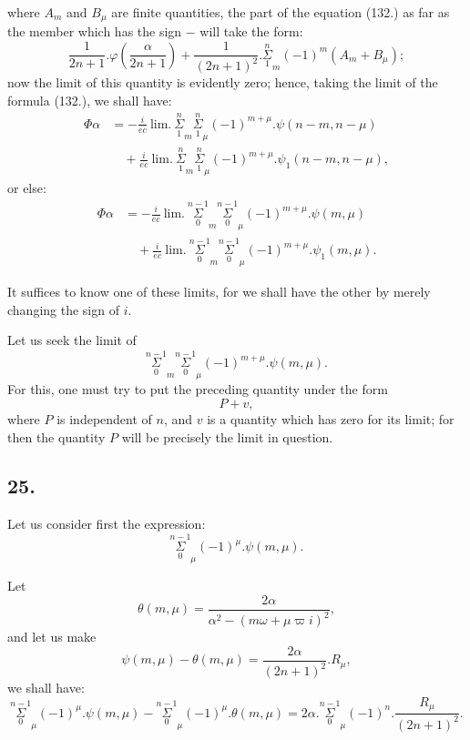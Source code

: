 \documentclass{article}
\begin{document}
where $A_{m}$ and $B_{\mu}$ are finite quantities, the part of the equation (132.) as far as the member which has the sign $-$ will take the form:
\[ \frac{1}{2n+1}.\varphi\left(\frac{\alpha}{2n+1}\right)+\frac{1}{(2n+1)^{2}}.\overset{n}{\underset{1}{\Sigma}}_{m}(-1)^{m}(A_{m}+B_{\mu}); \]
now the limit of this quantity is evidently zero; hence, taking the limit of the formula (132.), we shall have:
\[ \begin{aligned}
\Phi\alpha&=-\frac{i}{ec}\ \text{lim.}\ \overset{n}{\underset{1}{\Sigma}}_{m}\overset{n}{\underset{1}{\Sigma}}_{\mu}(-1)^{m+\mu}.\psi(n-m,n-\mu)\\
&\quad+\frac{i}{ec}\ \text{lim.}\ \overset{n}{\underset{1}{\Sigma}}_{m}\overset{n}{\underset{1}{\Sigma}}_{\mu}(-1)^{m+\mu}.\psi_{1}(n-m,n-\mu),
\end{aligned} \]
or else:
\[ \begin{aligned}
\Phi\alpha&=-\frac{i}{ec}\ \text{lim.}\ \overset{n-1}{\underset{0}{\Sigma}}_{m}\overset{n-1}{\underset{0}{\Sigma}}_{\mu}(-1)^{m+\mu}.\psi(m,\mu)\\
&\quad+\frac{i}{ec}\ \text{lim.}\ \overset{n-1}{\underset{0}{\Sigma}}_{m}\overset{n-1}{\underset{0}{\Sigma}}_{\mu}(-1)^{m+\mu}.\psi_{1}(m,\mu).
\end{aligned} \tag{134.} \]

It suffices to know one of these limits, for we shall have the other by merely changing the sign of $i$.

Let us seek the limit of
\[ \overset{n-1}{\underset{0}{\Sigma}}_{m}\overset{n-1}{\underset{0}{\Sigma}}_{\mu}(-1)^{m+\mu}.\psi(m,\mu). \]
For this, one must try to put the preceding quantity under the form
\[ P+v, \]
where $P$ is independent of $n$, and $v$ is a quantity which has zero for its limit; for then the quantity $P$ will be precisely the limit in question.

\subsection*{25.}

Let us consider first the expression:
\[ \overset{n-1}{\underset{0}{\Sigma}}_{\mu}(-1)^{\mu}.\psi(m,\mu). \]

Let
\[ \theta(m,\mu)=\frac{2\alpha}{\alpha^{2}-(m\omega+\mu\varpi i)^{2}}, \tag{135.} \]
and let us make
\[ \psi(m,\mu)-\theta(m,\mu)=\frac{2\alpha}{(2n+1)^{2}}.R_{\mu}, \tag{136.} \]
we shall have:
\[ \overset{n-1}{\underset{0}{\Sigma}}_{\mu}(-1)^{\mu}.\psi(m,\mu)-\overset{n-1}{\underset{0}{\Sigma}}_{\mu}(-1)^{\mu}.\theta(m,\mu)=2\alpha.\overset{n-1}{\underset{0}{\Sigma}}_{\mu}(-1)^{n}.\frac{R_{\mu}}{(2n+1)^{2}}. \tag{137.} \]
\end{document}
